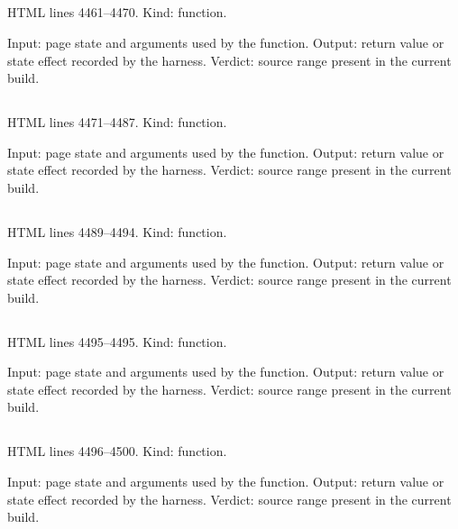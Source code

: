 \subsection*{\texttt{}}
\label{vf_179_controlBatchRecords}
HTML lines 4461--4470. Kind: function.

Input: page state and arguments used by the function.
Output: return value or state effect recorded by the harness.
Verdict: source range present in the current build.

\subsection*{\texttt{}}
\label{vf_180_controlBatchGraph}
HTML lines 4471--4487. Kind: function.

Input: page state and arguments used by the function.
Output: return value or state effect recorded by the harness.
Verdict: source range present in the current build.

\subsection*{\texttt{}}
\label{vf_181_sopControlSpec}
HTML lines 4489--4494. Kind: function.

Input: page state and arguments used by the function.
Output: return value or state effect recorded by the harness.
Verdict: source range present in the current build.

\subsection*{\texttt{}}
\label{vf_182_sopFmt}
HTML lines 4495--4495. Kind: function.

Input: page state and arguments used by the function.
Output: return value or state effect recorded by the harness.
Verdict: source range present in the current build.

\subsection*{\texttt{}}
\label{vf_183_sopTime}
HTML lines 4496--4500. Kind: function.

Input: page state and arguments used by the function.
Output: return value or state effect recorded by the harness.
Verdict: source range present in the current build.

